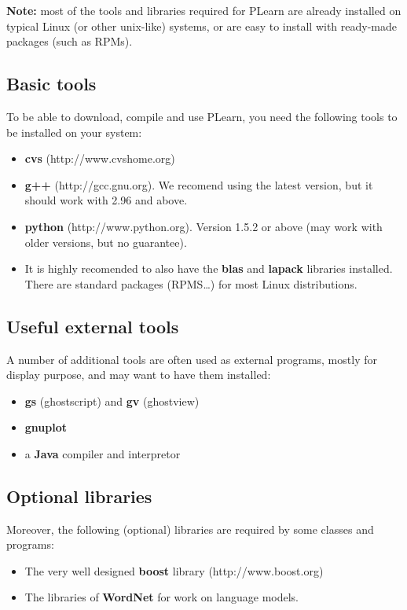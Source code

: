 \documentclass[11pt]{book}
\begin{document}
{\bf Note:} most of the tools and libraries required for PLearn are already
installed on typical Linux (or other unix-like) systems, or are easy to
install with ready-made packages (such as RPMs). 

\subsection{Basic tools}

To be able to download, compile and use PLearn, you need the following
tools to be installed on your system:
\begin{itemize}
\item {\bf cvs} (http://www.cvshome.org)
\item {\bf g++} (http://gcc.gnu.org). We recomend using the latest
version, but it should work with 2.96 and above.
\item {\bf python} (http://www.python.org). Version 1.5.2 or above (may
work with older versions, but no guarantee).
\item It is highly recomended to also have the {\bf blas} and {\bf lapack}
libraries installed. There are standard packages (RPMS\ldots) for most
Linux distributions.
\end{itemize}

\subsection{Useful external tools}

A number of additional tools are often used as external programs, mostly for
display purpose, and may want to have them installed: 
\begin{itemize}
\item {\bf gs} (ghostscript) and {\bf gv} (ghostview)
\item {\bf gnuplot}
\item a {\bf Java} compiler and interpretor
\end{itemize}


\subsection{Optional libraries}

Moreover, the following (optional) libraries are required by some classes and programs:
\begin{itemize}
\item The very well designed {\bf boost} library (http://www.boost.org)
\item The libraries of {\bf WordNet} for work on language models.
\end{itemize}
\end{document}

